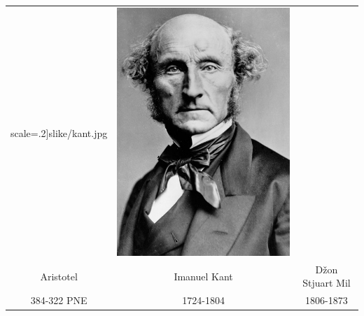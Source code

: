 \documentclass[a4paper]{article}
\begin{document}
\begin{table}[h!]
\begin{center}
\begin{tabular}{|c|c|c|}
scale=.2]{slike/kant.jpg} & \includegraphics[scale=.2]{slike/mil.jpg} \\Aristotel & Imanuel Kant & Džon Stjuart Mil\\ 384-322 PNE & 1724-1804 & 1806-1873\\ \hline \end{tabular}
\label{tab:tabela1}
\end{center}
\end{table}
\end{document}
